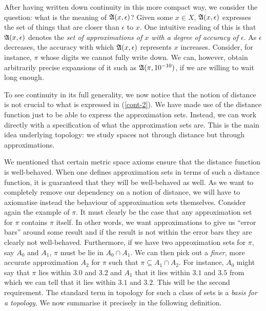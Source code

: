 After having written down continuity in this more compact way, we consider the question:
what is the meaning of $\mathfrak{A}(x, \epsilon)$? Given some $x \in X$, $\mathfrak{A}(x, \epsilon)$ expresses the set
of things that are closer than $\epsilon$ to $x$. One intuitive reading of this is that
$\mathfrak{A}(x, \epsilon)$ denotes the \emph{set of approximations of $x$ with a degree of accuracy of
  $\epsilon$}. As $\epsilon$ decreases, the accuracy with which $\mathfrak{A}(x, \epsilon)$ represents $x$ increases.
Consider, for instance, $\pi$ whose digits we cannot fully write down. We can, however,
obtain arbitrarily precise expansions of it such as $\mathfrak{A}(\pi, 10^{-10})$, if we are
willing to wait long enough.

To see continuity in its full generality, we now notice that the notion of distance is not
crucial to what is expressed in (\ref{cont-2}). We have made use of the distance function
just to be able to express the approximation sets. Instead, we can work directly with a
specification of what the approximation sets are. This is the main idea underlying
topology: we study spaces not through distance but through approximations.

We mentioned that certain metric space axioms ensure that the distance function is
well-behaved. When one defines approximation sets in terms of such a distance function, it
is guaranteed that they will be well-behaved as well. As we want to completely remove our
dependency on a notion of distance, we will have to axiomatise instead the behaviour of
approximation sets themselves. Consider again the example of $\pi$. It must clearly be the
case that any approximation set for $\pi$ contains $\pi$ itself. In other words, we want
approximations to give us ``error bars'' around some result and if the result is not
within the error bars they are clearly not well-behaved. Furthermore, if we have two
approximation sets for $\pi$, say $A_0$ and $A_1$, $\pi$ must be lie in $A_0 \cap A_1$. We can
then pick out a \emph{finer}, more accurate approximation $A_2$ for $\pi$ such that $\pi \subseteq A_1
\cap A_2$. For instance, $A_0$ might say that $\pi$ lies within $3.0$ and $3.2$ and $A_1$ that it
lies within $3.1$ and $3.5$ from which we can tell that it lies within $3.1$ and $3.2$.
This will be the second requirement. The standard term in topology for such a class of
sets is a \emph{basis for a topology}. We now summarise it precisely in the following
definition.

